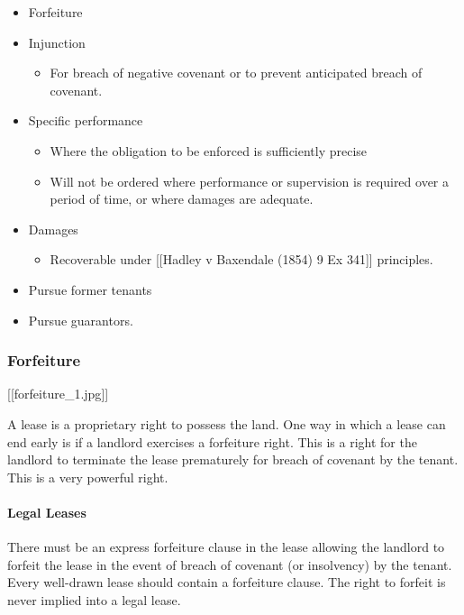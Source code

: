 \documentclass[
]{article}
\providecommand{\tightlist}{%
  \setlength{\itemsep}{0pt}\setlength{\parskip}{0pt}}
\begin{document}
\begin{itemize}
\tightlist
\item
  Forfeiture
\item
  Injunction

  \begin{itemize}
  \tightlist
  \item
    For breach of negative covenant or to prevent anticipated breach of
    covenant.
  \end{itemize}
\item
  Specific performance

  \begin{itemize}
  \tightlist
  \item
    Where the obligation to be enforced is sufficiently precise
  \item
    Will not be ordered where performance or supervision is required
    over a period of time, or where damages are adequate.
  \end{itemize}
\item
  Damages

  \begin{itemize}
  \tightlist
  \item
    Recoverable under {[}{[}Hadley v Baxendale (1854) 9 Ex 341{]}{]}
    principles.
  \end{itemize}
\item
  Pursue former tenants
\item
  Pursue guarantors.
\end{itemize}

\hypertarget{forfeiture-1}{%
\subsubsection{Forfeiture}\label{forfeiture-1}}

{[}{[}forfeiture\_1.jpg{]}{]}

A lease is a proprietary right to possess the land. One way in which a
lease can end early is if a landlord exercises a forfeiture right. This
is a right for the landlord to terminate the lease prematurely for
breach of covenant by the tenant. This is a very powerful right.

\hypertarget{legal-leases}{%
\paragraph{Legal Leases}\label{legal-leases}}

There must be an express forfeiture clause in the lease allowing the
landlord to forfeit the lease in the event of breach of covenant (or
insolvency) by the tenant. Every well-drawn lease should contain a
forfeiture clause. The right to forfeit is never implied into a legal
lease.
\end{document}
